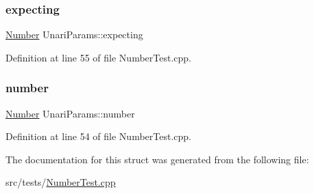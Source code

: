 \subsubsection{\texorpdfstring{expecting}{expecting}}
{\footnotesize\ttfamily \hyperlink{classteam22_1_1_math_1_1_number}{Number} Unari\+Params\+::expecting}



Definition at line 55 of file Number\+Test.\+cpp.

\mbox{\label{struct_unari_params_a85762f9bb00163170524b43c7947dca1}} 
\subsubsection{\texorpdfstring{number}{number}}
{\footnotesize\ttfamily \hyperlink{classteam22_1_1_math_1_1_number}{Number} Unari\+Params\+::number}



Definition at line 54 of file Number\+Test.\+cpp.



The documentation for this struct was generated from the following file\+:\begin{DoxyCompactItemize}
\item 
src/tests/\hyperlink{_number_test_8cpp}{Number\+Test.\+cpp}\end{DoxyCompactItemize}
